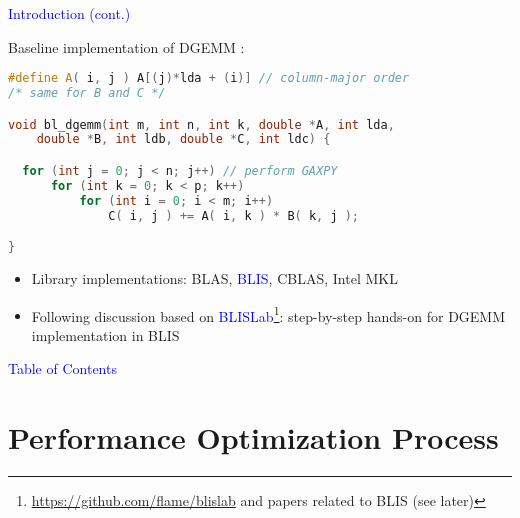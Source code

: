 \documentclass[11pt]{beamer}
\begin{document}
\begin{frame}[fragile]{\textcolor{blue}{Introduction (cont.)}}


Baseline implementation of DGEMM :
\begin{footnotesize}
\begin{lstlisting}[language=C++]
#define A( i, j ) A[(j)*lda + (i)] // column-major order
/* same for B and C */

void bl_dgemm(int m, int n, int k, double *A, int lda, 
	double *B, int ldb, double *C, int ldc) {

  for (int j = 0; j < n; j++) // perform GAXPY
      for (int k = 0; k < p; k++)
          for (int i = 0; i < m; i++)
              C( i, j ) += A( i, k ) * B( k, j );

}
\end{lstlisting}
\end{footnotesize}

\begin{itemize}
\item Library implementations: BLAS, \textcolor{blue}{BLIS},  CBLAS, Intel MKL
\item Following discussion based on \textcolor{blue}{BLISLab}\footnote{\url{https://github.com/flame/blislab} and papers related to BLIS (see later)}: step-by-step hands-on for DGEMM implementation in BLIS
\end{itemize}

\end{frame}


\begin{frame}{\textcolor{blue}{Table of Contents}}

\tableofcontents

\end{frame}

\section{Performance Optimization Process}
\end{document}
